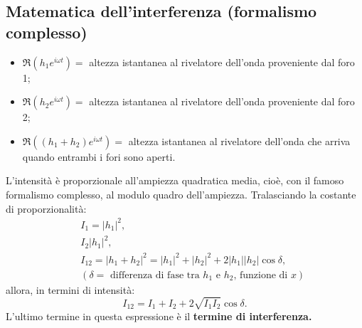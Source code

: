 \subsection*{Matematica dell'interferenza (formalismo complesso)}
\begin{itemize}
\item $\Re{\left(h_1 e^{i\omega t} \right)}=$ altezza istantanea al rivelatore dell'onda proveniente dal foro 1;
\item $\Re{\left(h_2 e^{i\omega t} \right)}=$ altezza istantanea al rivelatore dell'onda proveniente dal foro 2;
\item $\Re{\left( \left(h_1 +h_2 \right) e^{i\omega t} \right)}=$ altezza istantanea al rivelatore dell'onda che arriva quando entrambi i fori sono aperti.
\end{itemize}
L'intensità è proporzionale all'ampiezza quadratica media, cioè, con il famoso formalismo complesso, al modulo quadro dell'ampiezza. Tralasciando la costante di proporzionalità:
\begin{eqnarray}
& &I_1= \lvert {h_1} \rvert ^2, \nonumber \\
& &I_2 \lvert {h_1} \rvert ^2, \\
& &I_{12}= \lvert {h_1+h_2} \rvert ^2= \lvert {h_1} \rvert ^2+ \lvert {h_2} \rvert ^2 + 2 \lvert {h_1} \rvert \lvert {h_2} \rvert \cos \delta ,\nonumber  \\ 
& &\left( \delta = \textrm{ differenza di fase tra } h_1 \textrm{ e } h_2 \textrm{, funzione di }x \right)\nonumber 
\end{eqnarray}
allora, in termini di intensità:
	\begin{equation}
		\boxed{
			I_{12}= I_1 + I_2 + 2 \sqrt{I_1 I_2}\cos \delta.
			}
	\end{equation}
L'ultimo termine in questa espressione è il \textbf{termine di interferenza.}
